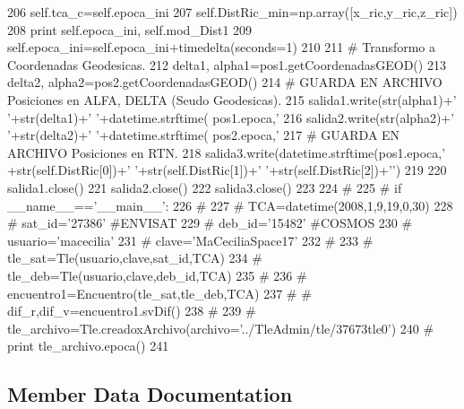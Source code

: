 \begin{DoxyCode}
206                 self.tca_c=self.epoca_ini
207                 self.DistRic_min=np.array([x_ric,y_ric,z_ric])
208             print self.epoca_ini, self.mod_Dist1
209             self.epoca_ini=self.epoca_ini+timedelta(seconds=1)
210             
211             # Transformo a Coordenadas Geodesicas.
212             delta1, alpha1=pos1.getCoordenadasGEOD()
213             delta2, alpha2=pos2.getCoordenadasGEOD()
214             # GUARDA EN ARCHIVO Posiciones en ALFA, DELTA (Seudo Geodesicas).
215             salida1.write(str(alpha1)+' '+str(delta1)+' '+datetime.strftime(
      pos1.epoca,'%
216             salida2.write(str(alpha2)+' '+str(delta2)+' '+datetime.strftime(
      pos2.epoca,'%
217             # GUARDA EN ARCHIVO Posiciones en RTN.
218             salida3.write(datetime.strftime(pos1.epoca,'%
      +str(self.DistRic[0])+' '+str(self.DistRic[1])+' '+str(self.DistRic[2])+'\n')
219 
220         salida1.close()
221         salida2.close()
222         salida3.close()
223 
224 #     
225 # if __name__=='__main__':
226 #      
227 #      TCA=datetime(2008,1,9,19,0,30)
228 #      sat_id='27386' #ENVISAT
229 #      deb_id='15482' #COSMOS
230 #      usuario='macecilia'
231 #      clave='MaCeciliaSpace17'
232 #  
233 #      tle_sat=Tle(usuario,clave,sat_id,TCA)
234 #      tle_deb=Tle(usuario,clave,deb_id,TCA)
235 #      
236 #      encuentro1=Encuentro(tle_sat,tle_deb,TCA)
237 # #     dif_r,dif_v=encuentro1.svDif()
238 #     
239 #     tle_archivo=Tle.creadoxArchivo(archivo='../TleAdmin/tle/37673tle0')
240 #     print tle_archivo.epoca()
241     
    \end{DoxyCode}


\subsection{\-Member \-Data \-Documentation}
\subsubsection[{archivo\-\_\-dif}]{}\label{classpruebas_1_1clase_tle_1_1_encuentro_af72762abc3ab894e7ffc1e5424215eb3}


